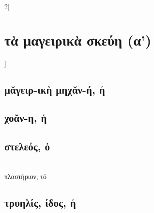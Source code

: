 \documentclass{book}
\begin{document}
\begin{multicols}{2}[\section{τὰ μαγειρικὰ σκεύη (α')}]
\subsection{μᾰγειρ-ικὴ μηχᾰν-ή, ἡ}
\subsection{χοᾰν-η, ἡ}
\subsection{στελεός, ὁ}
 ~\\
πλαστήριον, τό
\subsection{τρυηλίς, ίδος, ἡ}
~
\end{multicols}
\newpage  
\end{document}
